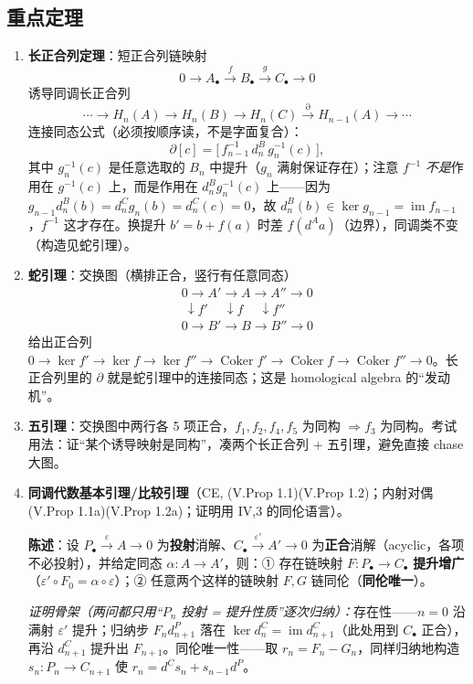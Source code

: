 \documentclass[12pt,a4paper]{ctexart}
\DeclareMathOperator{\Coker}{Coker}
\DeclareMathOperator{\im}{im}
\newcommand{\keypoint}{\text{\textbf{\ensuremath{\bigstar}}\;}}
\begin{document}
\subsection{\keypoint 重点定理}

\begin{enumerate}
  \item \textbf{长正合列定理}：短正合列链映射
  \[
    0\to A_\bullet\xrightarrow{f}B_\bullet\xrightarrow{g}C_\bullet\to0
  \]
  诱导同调长正合列
  \[
    \cdots\to H_n(A)\to H_n(B)\to H_n(C)\xrightarrow{\partial}H_{n-1}(A)\to\cdots
  \]
  连接同态公式（\keypoint 必须按顺序读，不是字面复合）：
  \[
    \partial[c]=\bigl[\,f_{n-1}^{-1}\,d_n^B\,g_n^{-1}(c)\,\bigr],
  \]
  其中 $g_n^{-1}(c)$ 是任意选取的 $B_n$ 中提升（$g_n$ 满射保证存在）；注意 $f^{-1}$ \emph{不是}作用在 $g^{-1}(c)$ 上，而是作用在 $d_n^B g_n^{-1}(c)$ 上——因为 $g_{n-1}d_n^B(b)=d_n^C g_n(b)=d_n^C(c)=0$，故 $d_n^B(b)\in\ker g_{n-1}=\im f_{n-1}$，$f^{-1}$ 这才存在。换提升 $b'=b+f(a)$ 时差 $f(d^A a)$（边界），同调类不变（构造见蛇引理）。
  \item \textbf{蛇引理}：交换图（横排正合，竖行有任意同态）
  \[
    \begin{array}{ccc}
      0\to A'\to A\to A''\to 0\\
      \ \downarrow f'\quad\ \downarrow f\quad\ \downarrow f''\\
      0\to B'\to B\to B''\to 0
    \end{array}
  \]
  给出正合列 $0\to\ker f'\to\ker f\to\ker f''\to\Coker f'\to\Coker f\to\Coker f''\to0$。\keypoint 长正合列里的 $\partial$ 就是蛇引理中的连接同态；这是 homological algebra 的“发动机”。
  \item \textbf{五引理}：交换图中两行各 5 项正合，$f_1,f_2,f_4,f_5$ 为同构 $\Rightarrow f_3$ 为同构。\keypoint 考试用法：证“某个诱导映射是同构”，凑两个长正合列 + 五引理，避免直接 chase 大图。
  \item \textbf{同调代数基本引理/比较引理}（CE, (V.Prop 1.1)(V.Prop 1.2)；内射对偶 (V.Prop 1.1a)(V.Prop 1.2a)；证明用 IV,3 的同伦语言）。

  \textbf{陈述}：设 $P_\bullet\xrightarrow{\varepsilon}A\to0$ 为\textbf{投射}消解、$C_\bullet\xrightarrow{\varepsilon'}A'\to0$ 为\textbf{正合}消解（acyclic，各项不必投射），并给定同态 $\alpha\colon A\to A'$，则：① 存在链映射 $F\colon P_\bullet\to C_\bullet$ \textbf{提升增广}（$\varepsilon'\circ F_0=\alpha\circ\varepsilon$）；② 任意两个这样的链映射 $F,G$ 链同伦（\textbf{同伦唯一}）。

  \textit{证明骨架（两问都只用“$P_n$ 投射 = 提升性质”逐次归纳）：}存在性——$n=0$ 沿满射 $\varepsilon'$ 提升；归纳步 $F_nd^P_{n+1}$ 落在 $\ker d^C_n=\im d^C_{n+1}$（\keypoint 此处用到 $C_\bullet$ 正合），再沿 $d^C_{n+1}$ 提升出 $F_{n+1}$。同伦唯一性——取 $r_n=F_n-G_n$，同样归纳地构造 $s_n\colon P_n\to C_{n+1}$ 使 $r_n=d^Cs_n+s_{n-1}d^P$。


\end{enumerate}
\end{document}
